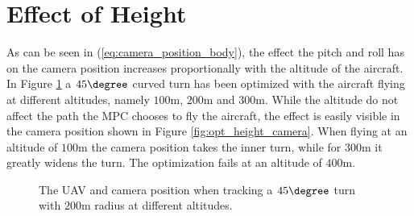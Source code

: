 \section{Effect of Height}

As can be seen in (\ref{eq:camera_position_body}), the effect the pitch and roll has on the camera position increases proportionally with the altitude of the aircraft. In Figure \ref{fig:opt_height} a $45\degree$ curved turn has been optimized with the aircraft flying at different altitudes, namely $100$m, $200$m and $300$m. While the altitude do not affect the path the MPC chooses to fly the aircraft, the effect is easily visible in the camera position shown in Figure \ref{fig:opt_height_camera}. When flying at an altitude of $100$m the camera position takes the inner turn, while for $300$m it greatly widens the turn. The optimization fails at an altitude of $400$m.

\begin{figure}
	\caption{The UAV and camera position when tracking a $45\degree$ turn with $200$m radius at different altitudes.}
	\label{fig:opt_height}
\end{figure}